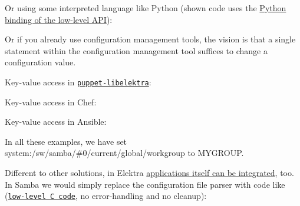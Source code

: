 Or using some interpreted language like Python (shown code uses the \hyperlink{doc_tutorials_python-kdb_md}{Python binding of the low-\/level A\+PI})\+:




Or if you already use configuration management tools, the vision is that a single statement within the configuration management tool suffices to change a configuration value.

Key-\/value access in \href{https://puppet.libelektra.org}{\tt puppet-\/libelektra}\+:




Key-\/value access in Chef\+:




Key-\/value access in Ansible\+:




In all these examples, we have set {\ttfamily system\+:/sw/samba/\#0/current/global/workgroup} to {\ttfamily M\+Y\+G\+R\+O\+UP}.

Different to other solutions, in Elektra \hyperlink{doc_tutorials_application-integration_md}{applications itself can be integrated}, too. In Samba we would simply replace the configuration file parser with code like (\href{https://doc.libelektra.org/api/latest/html/group__key.html}{\tt low-\/level C code}, no error-\/handling and no cleanup)\+:


